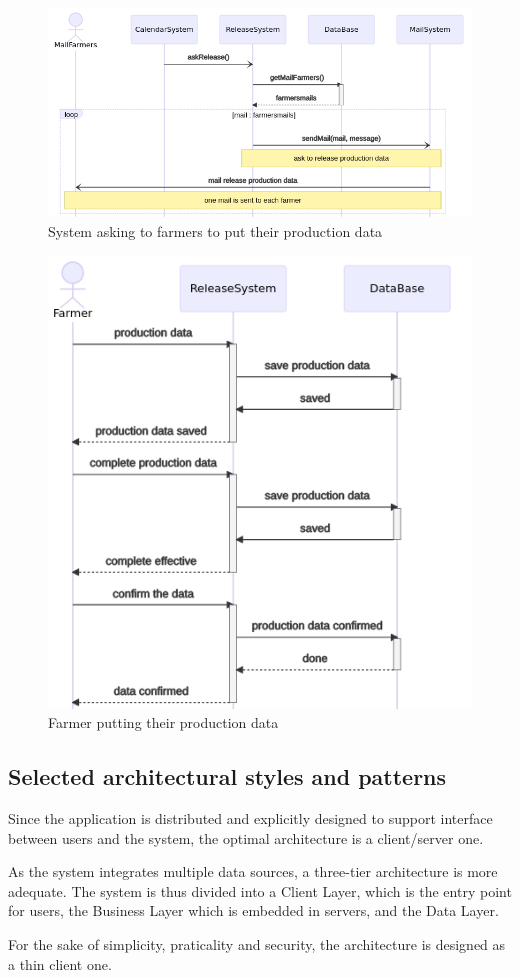 \begin{figure} [!h]
	\centering
	\includegraphics[width=\textwidth]{Images/seq_asking_prod_data.png}
	\caption{\label{fig:seq_asking_proddata} System asking to farmers to put their production data}
\end{figure}

\begin{figure} [!h]
	\centering
	\includegraphics[width=\textwidth]{Images/seq_request_prod_data.png}
	\caption{\label{fig:seq_request_prod_data} Farmer putting their production data}
\end{figure}

\subsection{Selected architectural styles and patterns}
Since the application is distributed and explicitly designed to support interface between users and the system, the optimal architecture is a client/server one. 

As the system integrates multiple data sources, a three-tier architecture is more adequate. The system is thus divided into a Client Layer, which is the entry point for users, the Business Layer which is embedded in servers, and the Data Layer. 

For the sake of simplicity, praticality and security, the architecture is designed as a thin client one.
